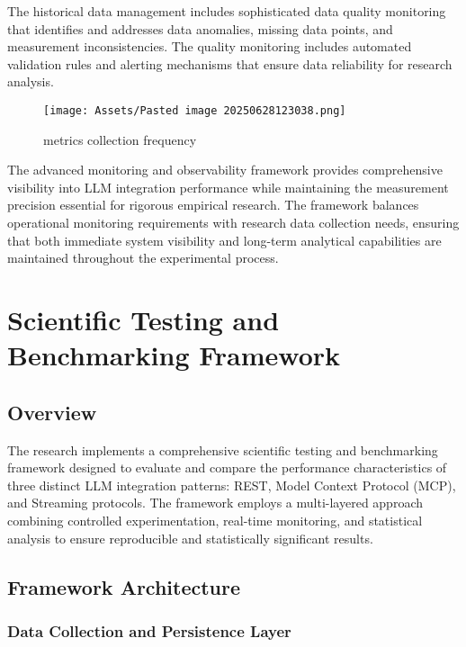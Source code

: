 
The historical data management includes sophisticated data quality monitoring that identifies and addresses data anomalies, missing data points, and measurement inconsistencies. The quality monitoring includes automated validation rules and alerting mechanisms that ensure data reliability for research analysis.

\begin{figure}[H]
    \centering
    \texttt{[image: Assets/Pasted image 20250628123038.png]}
    \caption{metrics collection frequency}
\end{figure}
The advanced monitoring and observability framework provides comprehensive visibility into LLM integration performance while maintaining the measurement precision essential for rigorous empirical research. The framework balances operational monitoring requirements with research data collection needs, ensuring that both immediate system visibility and long-term analytical capabilities are maintained throughout the experimental process.

\chapter{Scientific Testing and Benchmarking Framework}

\section{Overview}

The research implements a comprehensive scientific testing and benchmarking framework designed to evaluate and compare the performance characteristics of three distinct LLM integration patterns: REST, Model Context Protocol (MCP), and Streaming protocols. The framework employs a multi-layered approach combining controlled experimentation, real-time monitoring, and statistical analysis to ensure reproducible and statistically significant results.

\section{Framework Architecture}

\subsection{Data Collection and Persistence Layer}

